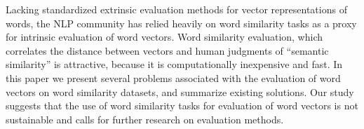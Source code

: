 Lacking standardized extrinsic evaluation methods for vector representations of words, the NLP community has relied heavily on word similarity tasks as a proxy for intrinsic evaluation of word vectors. Word similarity evaluation, which correlates the distance between vectors and human judgments of ``semantic similarity'' is attractive, because it is computationally inexpensive and fast.  In this paper we present several problems associated with the evaluation of word vectors on word similarity datasets, and summarize existing solutions. Our study suggests that the use of word similarity tasks for evaluation of word vectors is not sustainable and calls for further research on evaluation methods.
